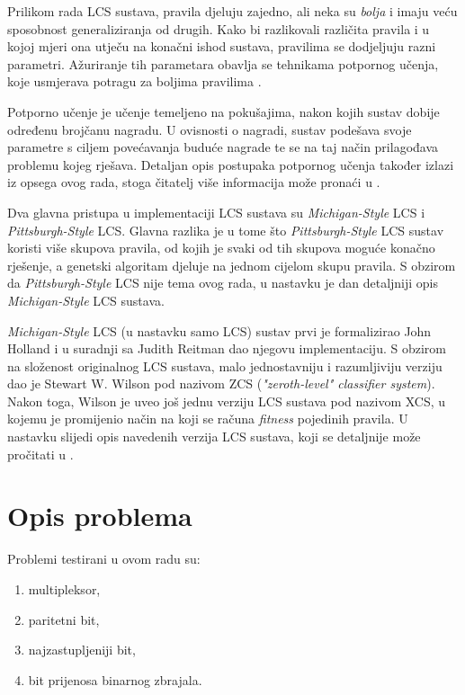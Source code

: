 \documentclass[times, utf8, zavrsni]{fer}
\begin{document}
Prilikom rada LCS sustava, pravila djeluju zajedno, ali neka su \emph{bolja} i imaju veću sposobnost generaliziranja od drugih.
Kako bi razlikovali različita pravila i u kojoj mjeri ona utječu na konačni ishod sustava, pravilima se dodjeljuju razni parametri.
Ažuriranje tih parametara obavlja se tehnikama potpornog učenja, koje usmjerava potragu za boljima pravilima \citep{3}.

Potporno učenje je učenje temeljeno na pokušajima, nakon kojih sustav dobije određenu brojčanu nagradu.
U ovisnosti o nagradi, sustav podešava svoje parametre s ciljem povećavanja buduće nagrade te se na taj način prilagođava problemu kojeg rješava.
Detaljan opis postupaka potpornog učenja također izlazi iz opsega ovog rada, stoga čitatelj više informacija može pronaći u \citep{7}.

Dva glavna pristupa u implementaciji LCS sustava su \emph{Michigan-Style} LCS i \emph{Pittsburgh-Style} LCS.
Glavna razlika je u tome što \emph{Pittsburgh-Style} LCS sustav koristi više skupova pravila, od kojih je svaki od tih skupova moguće konačno rješenje, a genetski algoritam djeluje na jednom cijelom skupu pravila. S obzirom da \emph{Pittsburgh-Style} LCS nije tema ovog rada, u nastavku je dan detaljniji opis \emph{Michigan-Style} LCS sustava.

\emph{Michigan-Style} LCS (u nastavku samo LCS) sustav prvi je formalizirao John Holland i u suradnji sa Judith Reitman dao njegovu implementaciju.
S obzirom na složenost originalnog LCS sustava, malo jednostavniju i razumljiviju verziju dao je Stewart W. Wilson pod nazivom ZCS (\emph{"zeroth-level" classifier system}).
Nakon toga, Wilson je uveo još jednu verziju LCS sustava pod nazivom XCS, u kojemu je promijenio način na koji se računa \emph{fitness} pojedinih pravila. U nastavku slijedi opis navedenih verzija LCS sustava, koji se detaljnije može pročitati u \citep{3}.


\chapter{Opis problema}
Problemi testirani u ovom radu su:
\begin{enumerate}
    \item multipleksor,
    \item paritetni bit,
    \item najzastupljeniji bit,
    \item bit prijenosa binarnog zbrajala.
\end{enumerate}
\end{document}
